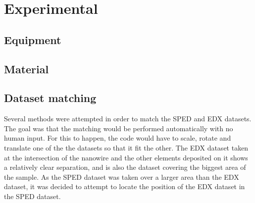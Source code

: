 \chapter{Experimental}

\section{Equipment}

\section{Material}

\section{Dataset matching}
\label{sec:method/dataset matching}

Several methods were attempted in order to match the SPED and EDX datasets. The goal was that the matching would be performed automatically with no human input. For this to happen, the code would have to scale, rotate and translate one of the the datasets so that it fit the other. The EDX dataset taken at the intersection of the nanowire and the other elements deposited on it shows a relatively clear separation, and is also the dataset covering the biggest area of the sample. As the SPED dataset was taken over a larger area than the EDX dataset, it was decided to attempt to locate the position of the EDX dataset in the SPED dataset.

